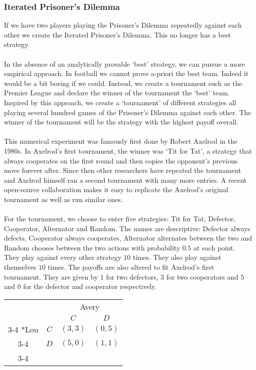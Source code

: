 \subsubsection{Iterated Prisoner's Dilemma}
If we have two players playing the Prisoner's Dilemma repeatedly against each other we create the Iterated Prisoner's Dilemma. This no longer has a best strategy.\\
\\
In the absence of an analytically provable `best' strategy, we can pursue a more empirical approach. In football we cannot prove a-priori the best team. Indeed it would be a bit boring if we could. Instead, we create a tournament such as the Premier League and declare the winner of the tournament the `best' team. Inspired by this approach, we create a `tournament' of different strategies all playing several hundred games of the Prisoner's Dilemma against each other. The winner of the tournament will be the strategy with the highest payoff overall.\\
\\
This numerical experiment was famously first done by Robert Axelrod\cite{axelrod} in the 1980s. In Axelrod's first tournament, the winner was `Tit for Tat', a strategy that always cooperates on the first round and then copies the opponent's previous move forever after. Since then other researchers have repeated the tournament and Axelrod himself ran a second tournament with many more entries. A recent open-source collaboration makes it easy to replicate the Axelrod's original tournament as well as run similar ones\cite{axelrod-github}.\\
\\
For the tournament, we choose to enter five strategies: Tit for Tat, Defector, Cooperator, Alternator and Random. The names are descriptive: Defector always defects, Cooperator always cooperates, Alternator alternates between the two and Random chooses between the two actions with probability $0.5$ at each point. They play against every other strategy $10$ times. They also play against themselves $10$ times. The payoffs are also altered to fit Axelrod's first tournament. They are given by $1$ for two defectors, $3$ for two cooperators and $5$ and $0$ for the defector and cooperator respectively.\\
\setlength{\extrarowheight}{2pt}
\begin{tabular}{cc|c|c|}
	& \multicolumn{1}{c}{} & \multicolumn{2}{c}{Avery}\\
	& \multicolumn{1}{c}{} & \multicolumn{1}{c}{$C$}  & \multicolumn{1}{c}{$D$} \\\cline{3-4}
	\multirow{2}*{Lou}  & $C$ & $(3,3)$ & $(0,5)$ \\\cline{3-4}
	& $D$ & $(5,0)$ & $(1,1)$ \\\cline{3-4}
\end{tabular}
